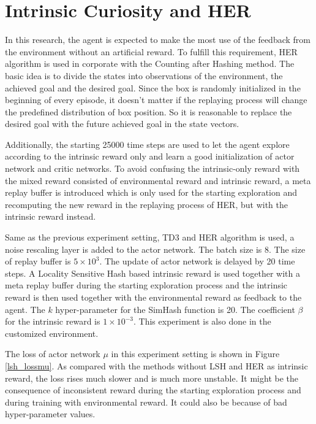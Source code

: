 \documentclass[a4paper, 12pt]{report}
\begin{document}
    \section{Intrinsic Curiosity and HER}

    In this research, the agent is expected to make the most use of the feedback from the environment without an artificial reward. To fulfill this requirement, HER algorithm is used in corporate with the Counting after Hashing method. The basic idea is to divide the states into observations of the environment, the achieved goal and the desired goal. Since the box is randomly initialized in the beginning of every episode, it doesn't matter if the replaying process will change the predefined distribution of box position. So it is reasonable to replace the desired goal with the future achieved goal in the state vectors. 

    Additionally, the starting 25000 time steps are used to let the agent explore according to the intrinsic reward only and learn a good initialization of actor network and critic networks. To avoid confusing the intrinsic-only reward with the mixed reward consisted of environmental reward and intrinsic reward, a meta replay buffer is introduced which is only used for the starting exploration and recomputing the new reward in the replaying process of HER, but with the intrinsic reward instead.

    Same as the previous experiment setting, TD3 and HER algorithm is used, a noise rescaling layer is added to the actor network. The batch size is 8. The size of replay buffer is $5\times 10^3$. The update of actor network is delayed by 20 time steps. A Locality Sensitive Hash based intrinsic reward is used together with a meta replay buffer during the starting exploration process and the intrinsic reward is then used together with the environmental reward as feedback to the agent. The $k$ hyper-parameter for the SimHash function is 20. The coefficient $\beta$ for the intrinsic reward is $1\times 10^{-3}$. This experiment is also done in the customized environment.

    The loss of actor network $\mu$ in this experiment setting is shown in Figure \ref{lsh_lossmu}. As compared with the methods without LSH and HER as intrinsic reward, the loss rises much slower and is much more unstable. It might be the consequence of inconsistent reward during the starting exploration process and during training with environmental reward. It could also be because of bad hyper-parameter values. 
\end{document}
